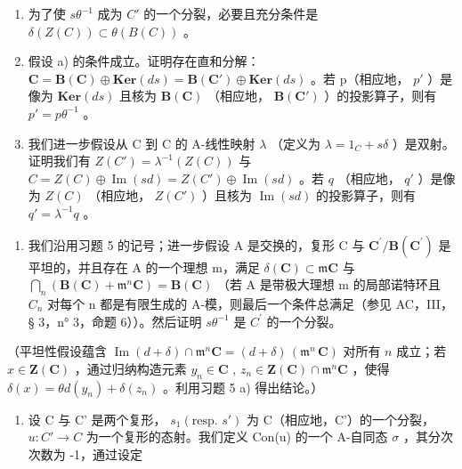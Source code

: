 \begin{enumerate}
\def\labelenumi{\alph{enumi})}
\item
  为了使 \(s\theta^{-1}\) 成为 \(C'\) 的一个分裂，必要且充分条件是 \(\delta(Z(C)) \subset \theta(B(C))\) 。
\item
  假设 a) 的条件成立。证明存在直和分解： \(\mathbf{C} = \mathbf{B}(\mathbf{C}) \oplus \mathbf{Ker}(ds) = \mathbf{B}(\mathbf{C}') \oplus \mathbf{Ker}(ds)\) 。若 p（相应地， \(p'\) ）是像为 \(\mathbf{Ker}(ds)\) 且核为 \(\mathbf{B}(\mathbf{C})\) （相应地， \(\mathbf{B}(\mathbf{C}')\) ）的投影算子，则有 \(p' = p\theta^{-1}\) 。
\item
  我们进一步假设从 C 到 C 的 A-线性映射 \(\lambda\) （定义为 \(\lambda = 1_{C} + s\delta\) ）是双射。证明我们有 \(Z(C') = \lambda^{-1}(Z(C))\) 与 \(C = Z(C) \oplus \operatorname{Im}(sd) = Z(C') \oplus \operatorname{Im}(sd)\) 。若 \(q\) （相应地， \(q'\) ）是像为 \(Z(C)\) （相应地， \(Z(C')\) ）且核为 \(\operatorname{Im}(sd)\) 的投影算子，则有 \(q' = \lambda^{-1} q\) 。
\end{enumerate}

\begin{enumerate}
\def\labelenumi{\arabic{enumi})}
\setcounter{enumi}{5}
\tightlist
\item
  我们沿用习题 5 的记号；进一步假设 A 是交换的，复形 C 与 \(\mathbf{C}^{\prime}/\mathbf{B}(\mathbf{C}^{\prime})\) 是平坦的，并且存在 A 的一个理想 m，满足 \(\delta(\mathbf{C}) \subset \mathfrak{m}\mathbf{C}\) 与 \(\bigcap_{n} (\mathbf{B}(\mathbf{C}) + \mathfrak{m}^{n}\mathbf{C}) = \mathbf{B}(\mathbf{C})\) （若 A 是带极大理想 m 的局部诺特环且 \(C_{n}\) 对每个 n 都是有限生成的 A-模，则最后一个条件总满足（参见 AC，III，§ 3，n° 3，命题 6））。然后证明 \(s\theta^{-1}\) 是 \(C^{\prime}\) 的一个分裂。
\end{enumerate}

（平坦性假设蕴含 \(\operatorname{Im}(d + \delta) \cap \mathfrak{m}^n\mathbf{C} = (d + \delta)\, (\mathfrak{m}^n\,\mathbf{C})\) 对所有 \(n\) 成立；若 \(x \in \mathbf{Z}(\mathbf{C})\) ，通过归纳构造元素 \(y_n \in \mathbf{C}\) , \(z_n \in \mathbf{Z}(\mathbf{C}) \cap \mathfrak{m}^n\mathbf{C}\) ，使得 \(\delta(x) = \theta d(y_n) + \delta(z_n)\) 。利用习题 5 a) 得出结论。）

\begin{enumerate}
\def\labelenumi{\arabic{enumi})}
\setcounter{enumi}{6}
\tightlist
\item
  设 C 与 C' 是两个复形， \(s_{1}(\text{resp. } s')\) 为 C（相应地，C'）的一个分裂， \(u : C' \to C\) 为一个复形的态射。我们定义 Con(u) 的一个 A-自同态 \(\sigma\) ，其分次次数为 -1，通过设定
\end{enumerate}

